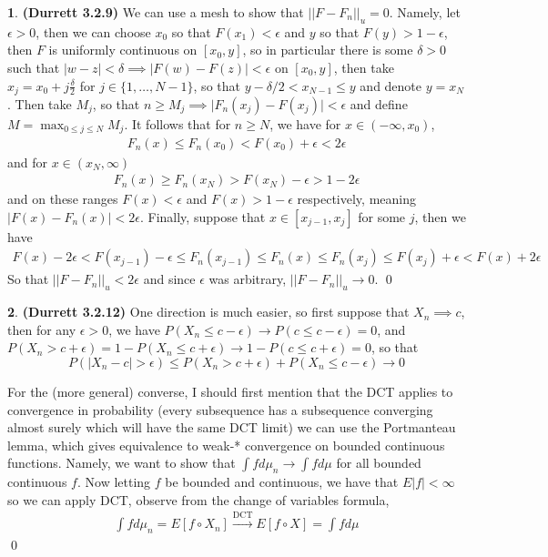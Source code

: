 \documentclass[10.5pt]{article}
\theoremstyle{definition}
\newtheorem{pb}{}
\newcommand{\set}[1]{\{#1\}}
\newcommand{\abs}[1]{\lvert#1\rvert}
\newcommand{\norm}[1]{\lvert\lvert#1\rvert\rvert}
\begin{document}
    \begin{pb}\textbf{(Durrett 3.2.9)}
        We can use a mesh to show that \(\norm{F - F_n}_u = 0\). Namely, let \(\epsilon > 0\), then we can choose \(x_0\) so that \(F(x_1) < \epsilon\) and \(y\) so that \(F(y) > 1 - \epsilon\), then \(F\) is uniformly continuous on \([x_0,y]\), so in particular there is some \(\delta > 0\) such that \(\abs{w - z} < \delta \implies \abs{F(w) - F(z)} < \epsilon\) on \([x_0,y]\), then take \(x_j = x_0 + j\frac{\delta}{2}\) for \(j \in \set{1,\hdots,N-1}\), so that \(y - \delta/2 < x_{N-1} \leq y\) and denote \(y = x_N\). Then take \(M_j\), so that \(n \geq M_j \implies \abs{F_n(x_j) - F(x_j)} < \epsilon\) and define \(M = \max_{0 \leq j \leq N}M_j\). It follows that for \(n \geq N\), we have for \(x \in (-\infty,x_0)\),
        \begin{align*}
            F_n(x) \leq F_n(x_0) < F(x_0) + \epsilon < 2 \epsilon
        \end{align*}
        and for \(x \in (x_N,\infty)\)
        \begin{align*}
            F_n(x) \geq F_n(x_N) > F(x_N) - \epsilon > 1- 2 \epsilon
        \end{align*}
        and on these ranges \(F(x) < \epsilon\) and \(F(x) > 1 - \epsilon\) respectively, meaning \(\abs{F(x) - F_n(x)} < 2 \epsilon\). Finally, suppose that \(x \in [x_{j-1},x_j]\) for some \(j\), then we have
        \begin{align*}
            F(x) - 2 \epsilon < F(x_{j-1}) - \epsilon \leq F_n(x_{j-1}) \leq F_n(x) \leq F_n(x_j) \leq F(x_j) + \epsilon < F(x) + 2 \epsilon
        \end{align*}
        So that \(\norm{F - F_n}_u < 2 \epsilon\) and since \(\epsilon\) was arbitrary, \(\norm{F -F_n}_u \to 0\). \qed
    \end{pb}
    \begin{pb}\textbf{(Durrett 3.2.12)}
        One direction is much easier, so first suppose that \(X_n \implies c\), then for any \(\epsilon > 0\), we have \(P(X_n \leq c - \epsilon) \to P(c \leq c - \epsilon) = 0\), and \(P(X_n > c + \epsilon) = 1 - P(X_n \leq c + \epsilon) \to 1 - P(c \leq c + \epsilon) = 0\), so that \[P(\abs{X_n - c} > \epsilon) \leq P(X_n > c + \epsilon) + P(X_n \leq c - \epsilon) \to 0\]

        For the (more general) converse, I should first mention that the DCT applies to convergence in probability (every subsequence has a subsequence converging almost surely which will have the same DCT limit) we can use the Portmanteau lemma, which gives equivalence to weak-* convergence on bounded continuous functions. Namely, we want to show that \(\int f d\mu_n \to \int f d\mu\) for all bounded continuous \(f\). Now letting \(f\) be bounded and continuous, we have that \(E\abs{f} < \infty\) so we can apply DCT, observe from the change of variables formula,
        \begin{align*}
            \int fd\mu_n = E[f\circ X_n] \overset{\text{DCT}}{\longrightarrow} E[f\circ X] = \int fd\mu
        \end{align*} \qed
    \end{pb}
\end{document}
